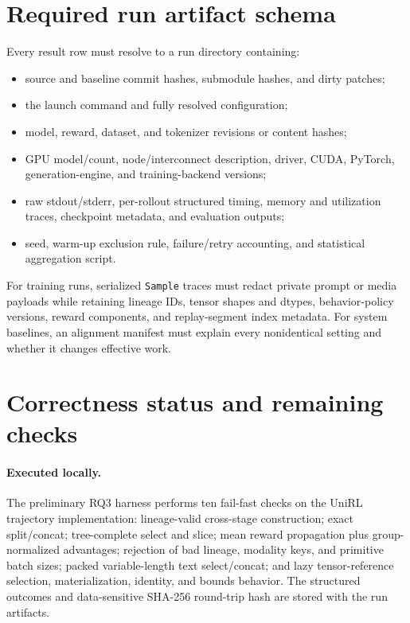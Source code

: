 \documentclass[10pt]{article}
\newcommand{\sample}{\texttt{Sample}}
\begin{document}
\section{Required run artifact schema}
\label{app:artifacts}

Every result row must resolve to a run directory containing:
\begin{itemize}
  \item source and baseline commit hashes, submodule hashes, and dirty patches;
  \item the launch command and fully resolved configuration;
  \item model, reward, dataset, and tokenizer revisions or content hashes;
  \item GPU model/count, node/interconnect description, driver, CUDA, PyTorch, generation-engine, and training-backend versions;
  \item raw stdout/stderr, per-rollout structured timing, memory and utilization traces, checkpoint metadata, and evaluation outputs;
  \item seed, warm-up exclusion rule, failure/retry accounting, and statistical aggregation script.
\end{itemize}

For training runs, serialized \sample{} traces must redact private prompt or media payloads while retaining lineage IDs, tensor shapes and dtypes, behavior-policy versions, reward components, and replay-segment index metadata.
For system baselines, an alignment manifest must explain every nonidentical setting and whether it changes effective work.

\clearpage
\section{Correctness status and remaining checks}
\label{app:correctness}

\paragraph{Executed locally.}
The preliminary RQ3 harness performs ten fail-fast checks on the UniRL trajectory implementation:
lineage-valid cross-stage construction; exact split/concat; tree-complete select and
slice; mean reward propagation plus group-normalized advantages; rejection of bad
lineage, modality keys, and primitive batch sizes; packed variable-length text
select/concat; and lazy tensor-reference selection, materialization, identity, and
bounds behavior. The structured outcomes and data-sensitive SHA-256 round-trip hash
are stored with the run artifacts.
\end{document}
